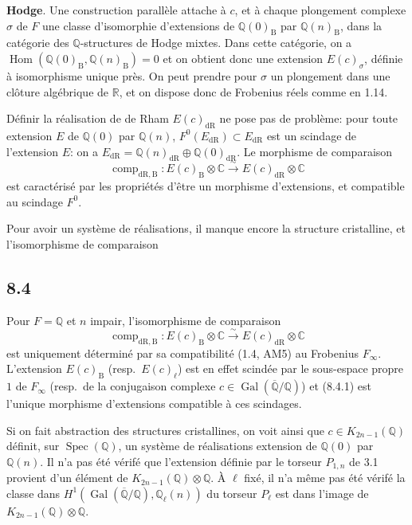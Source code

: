 \documentclass[12pt,a4paper]{article}
\theoremstyle{plain}
\theoremstyle{definition}
\theoremstyle{remark}
\DeclareMathOperator{\Hom}{Hom}
\DeclareMathOperator{\Spec}{Spec}
\DeclareMathOperator{\Gal}{Gal}
\DeclareMathOperator{\comp}{comp}
\newcommand{\DR}{\mathrm{dR}}
\newcommand{\B}{\mathrm{B}}
\newcommand{\Q}{\mathbb{Q}}
\newcommand{\C}{\mathbb{C}}
\newcommand{\R}{\mathbb{R}}
\begin{document}
\textbf{Hodge}. Une construction parall\`ele attache \`a $c$, et \`a chaque plongement complexe $\sigma$ de $F$ une classe d'isomorphie d'extensions de $\Q(0)_\B$ par $\Q(n)_\B$, dans la cat\'egorie des $\Q$-structures de Hodge mixtes. Dans cette cat\'egorie, on a $\Hom(\Q(0)_\B, \Q(n)_\B) = 0$ et on obtient donc une extension $E(c)_\sigma$, d\'efinie \`a isomorphisme unique pr\`es. On peut prendre pour $\sigma$ un plongement dans une cl\^oture alg\'ebrique de $\R$, et on dispose donc de Frobenius r\'eels comme en 1.14.

D\'efinir la r\'ealisation de de Rham $E(c)_\DR$ ne pose pas de probl\`eme: pour toute extension $E$ de $\Q(0)$ par $\Q(n)$, $F^0(E_\DR) \subset E_\DR$ est un scindage de l'extension $E$: on a $E_\DR = \Q(n)_\DR \oplus \Q(0)_\DR$. Le morphisme de comparaison
\begin{equation*}\tag{8.3.1}
\comp_{\DR,\B}: E(c)_\B \otimes \C \xrightarrow{\sim} E(c)_\DR \otimes \C
\end{equation*}
est caract\'eris\'e par les propri\'et\'es d'\^etre un morphisme d'extensions, et compatible au scindage $F^0$.

Pour avoir un syst\`eme de r\'ealisations, il manque encore la structure cristalline, et l'isomorphisme de comparaison

\subsection*{8.4}
Pour $F = \Q$ et $n$ impair, l'isomorphisme de comparaison
\begin{equation*}\tag{8.4.1}
\comp_{\DR,\B}: E(c)_\B \otimes \C \xrightarrow{\sim} E(c)_\DR \otimes \C
\end{equation*}
est uniquement d\'etermin\'e par sa compatibilit\'e (1.4, AM5) au Frobenius $F_\infty$. L'extension $E(c)_\B$ (resp.~$E(c)_\ell$) est en effet scind\'ee par le sous-espace propre $1$ de $F_\infty$ (resp.~de la conjugaison complexe $c \in \Gal(\overline{\Q}/\Q)$) et (8.4.1) est l'unique morphisme d'extensions compatible \`a ces scindages.

Si on fait abstraction des structures cristallines, on voit ainsi que $c \in K_{2n-1}(\Q)$ d\'efinit, sur $\Spec(\Q)$, un syst\`eme de r\'ealisations extension de $\Q(0)$ par $\Q(n)$. Il n'a pas \'et\'e v\'erif\'e que l'extension d\'efinie par le torseur $P_{1,n}$ de 3.1 provient d'un \'el\'ement de $K_{2n-1}(\Q) \otimes \Q$. \`A $\ell$ fix\'e, il n'a m\^eme pas \'et\'e v\'erif\'e la classe dans $H^1(\Gal(\overline{\Q}/\Q), \Q_\ell(n))$ du torseur $P_\ell$ est dans l'image de $K_{2n-1}(\Q) \otimes \Q$.
\end{document}
